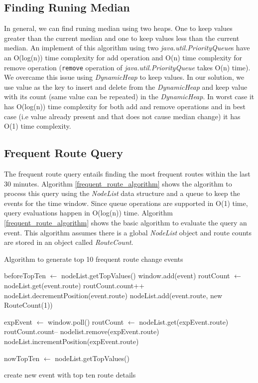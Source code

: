 \subsection{Finding Runing Median}
In general, we can find runing median using two heaps. One to keep values greater than the current median and one to keep values less than the current median. An implement of this algorithm using two \textit{java.util.PriorityQueue}s have an O(log(n)) time complexity for add operation and O(n) time complexity for remove operation (\texttt{remove} operation of \textit{java.util.PriorityQueue} takes O(n) time).  We overcame this issue using \textit{DynamicHeap} to keep values. In our solution, we use value as the key to insert and delete from the \textit{DynamicHeap} and keep value with its count (same value can be repeated) in the \textit{DynamicHeap}. In worst case it has O(log(n)) time complexity for both add and remove operations and in best case (i.e value already present and that does not cause median change) it has O(1) time complexity.

\subsection{Frequent Route Query}

The frequent route query entails finding the most frequent routes within the last 30 minutes. Algorithm \ref{frequent_route_algorithm} shows the algorithm to process this query using the \textit{NodeList} data structure and a queue to keep the events for the time window.  Since queue operations are supported in O(1) time, query evaluations happen in O(log(n)) time. Algorithm \ref{frequent_route_algorithm} shows the basic algorithm to evaluate the query an event. This algorithm assumes there is a global \textit{NodeList} object and route counts are stored in an object called \textit{RouteCount}. 

\begin{algorithm}
\caption{Algorithm to generate top 10 frequent route change events}
\label{frequent_route_algorithm}
\begin{algorithmic}
\small 
\STATE beforeTopTen $\leftarrow$ nodeList.getTopValues() 
\STATE window.add(event) 
	\STATE routCount $\leftarrow$ nodeList.get(event.route) 
	\STATE routCount.count++ 
	\STATE nodeList.decrementPosition(event.route) 
\ELSE
	\STATE nodeList.add(event.route, new RouteCount(1)) 
\ENDIF

	\STATE  expEvent $\leftarrow$ window.poll() 
	\STATE  routCount $\leftarrow$ nodeList.get(expEvent.route)
	\STATE  routCount.count-- 
		\STATE nodelist.remove(expEvent.route)
	\ELSE
		\STATE nodeList.incrementPosition(expEvent.route) 
	\ENDIF
\ENDWHILE

\STATE nowTopTen $\leftarrow$ nodeList.getTopValues() 

	\STATE create new event with top ten route details 
\ENDIF

\end{algorithmic}
\end{algorithm}

